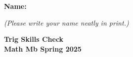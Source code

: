 \documentclass{article}
\begin{document}
 

 \noindent
{\large \mbox{} \hfill \bf Name:\underline{\hspace{2.8in}}}

 {\mbox{} \hfill \it (Please write your name neatly in print.)}


 
\medskip
 
\noindent
{\large\bf
Trig Skills Check \\ Math Mb Spring 2025}
\noindent

\end{document}
